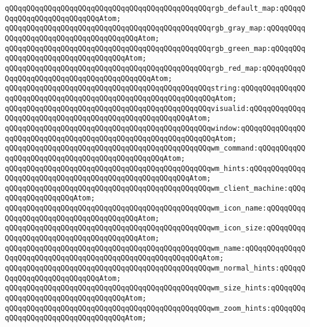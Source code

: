 \verb|qQQqqQQqqQQqqQQqqQQqqQQqqQQqqQQqqQQqqQQqqQQqqQQqrgb_default_map:qQQqqQQqqQQqqQQqqQQqqQQqqQQqAtom;|\newline
\verb|qQQqqQQqqQQqqQQqqQQqqQQqqQQqqQQqqQQqqQQqqQQqqQQqrgb_gray_map:qQQqqQQqqQQqqQQqqQQqqQQqqQQqqQQqqQQqqQQqAtom;|\newline
\verb|qQQqqQQqqQQqqQQqqQQqqQQqqQQqqQQqqQQqqQQqqQQqqQQqrgb_green_map:qQQqqQQqqQQqqQQqqQQqqQQqqQQqqQQqqQQqAtom;|\newline
\verb|qQQqqQQqqQQqqQQqqQQqqQQqqQQqqQQqqQQqqQQqqQQqqQQqrgb_red_map:qQQqqQQqqQQqqQQqqQQqqQQqqQQqqQQqqQQqqQQqqQQqAtom;|\newline
\verb|qQQqqQQqqQQqqQQqqQQqqQQqqQQqqQQqqQQqqQQqqQQqqQQqstring:qQQqqQQqqQQqqQQqqQQqqQQqqQQqqQQqqQQqqQQqqQQqqQQqqQQqqQQqqQQqqQQqAtom;|\newline
\verb|qQQqqQQqqQQqqQQqqQQqqQQqqQQqqQQqqQQqqQQqqQQqqQQqvisualid:qQQqqQQqqQQqqQQqqQQqqQQqqQQqqQQqqQQqqQQqqQQqqQQqqQQqqQQqAtom;|\newline
\verb|qQQqqQQqqQQqqQQqqQQqqQQqqQQqqQQqqQQqqQQqqQQqqQQqwindow:qQQqqQQqqQQqqQQqqQQqqQQqqQQqqQQqqQQqqQQqqQQqqQQqqQQqqQQqqQQqqQQqAtom;|\newline
\verb|qQQqqQQqqQQqqQQqqQQqqQQqqQQqqQQqqQQqqQQqqQQqqQQqwm_command:qQQqqQQqqQQqqQQqqQQqqQQqqQQqqQQqqQQqqQQqqQQqqQQqAtom;|\newline
\verb|qQQqqQQqqQQqqQQqqQQqqQQqqQQqqQQqqQQqqQQqqQQqqQQqwm_hints:qQQqqQQqqQQqqQQqqQQqqQQqqQQqqQQqqQQqqQQqqQQqqQQqqQQqqQQqAtom;|\newline
\verb|qQQqqQQqqQQqqQQqqQQqqQQqqQQqqQQqqQQqqQQqqQQqqQQqwm_client_machine:qQQqqQQqqQQqqQQqqQQqAtom;|\newline
\verb|qQQqqQQqqQQqqQQqqQQqqQQqqQQqqQQqqQQqqQQqqQQqqQQqwm_icon_name:qQQqqQQqqQQqqQQqqQQqqQQqqQQqqQQqqQQqqQQqAtom;|\newline
\verb|qQQqqQQqqQQqqQQqqQQqqQQqqQQqqQQqqQQqqQQqqQQqqQQqwm_icon_size:qQQqqQQqqQQqqQQqqQQqqQQqqQQqqQQqqQQqqQQqAtom;|\newline
\verb|qQQqqQQqqQQqqQQqqQQqqQQqqQQqqQQqqQQqqQQqqQQqqQQqwm_name:qQQqqQQqqQQqqQQqqQQqqQQqqQQqqQQqqQQqqQQqqQQqqQQqqQQqqQQqqQQqAtom;|\newline
\verb|qQQqqQQqqQQqqQQqqQQqqQQqqQQqqQQqqQQqqQQqqQQqqQQqwm_normal_hints:qQQqqQQqqQQqqQQqqQQqqQQqqQQqAtom;|\newline
\verb|qQQqqQQqqQQqqQQqqQQqqQQqqQQqqQQqqQQqqQQqqQQqqQQqwm_size_hints:qQQqqQQqqQQqqQQqqQQqqQQqqQQqqQQqqQQqAtom;|\newline
\verb|qQQqqQQqqQQqqQQqqQQqqQQqqQQqqQQqqQQqqQQqqQQqqQQqwm_zoom_hints:qQQqqQQqqQQqqQQqqQQqqQQqqQQqqQQqqQQqAtom;|\newline

